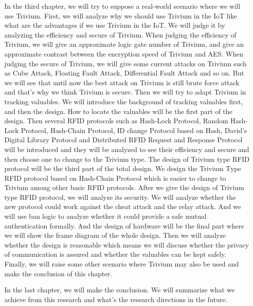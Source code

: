 \begin{bigabstract}
In the third chapter, we will try to suppose a real-world scenario where we will use Trivium. First, we will analyze why we should use Trivium in the IoT like what are the advantages if we use Trivium in the IoT. We will judge it by analyzing the efficiency and secure of Trivium. When judging the efficiency of Trivium, we will give an approximate logic gate number of Trivium, and give an approximate contrast between the encryption speed of Trivium and AES. When judging the secure of Trivium, we will give some current attacks on Trivium such as Cube Attack, Floating Fault Attack, Differential Fault Attack and so on. But we will see that until now the best attack on Trivium is still brute force attack and that’s why we think Trivium is secure. Then we will try to adapt Trivium in tracking valuables. We will introduce the background of tracking valuables first, and then the design. How to locate the valuables will be the first part of the design. Then several RFID protocols such as Hash-Lock Protocol, Random Hash-Lock Protocol, Hash-Chain Protocol, ID change Protocol based on Hash, David's Digital Library Protocol and Distributed RFID Request and Response Protocol will be introduced and they will be analyzed to see their efficiency and secure and then choose one to change to the Trivium type. The design of Trivium type RFID protocol will be the third part of the total design. We design the Trivium Type RFID protocol based on Hash-Chain Protocol which is easier to change to Trivium among other basic RFID protocols. After we give the design of Trivium type RFID protocol, we will analyze its security. We will analyze whether the new protocol could work against the cheat attack and the relay attack. And we will use ban logic to analyze whether it could provide a safe mutual authentication formally. And the design of hardware will be the final part where we will show the frame diagram of the whole design. Then we will analyze whether the design is reasonable which means we will discuss whether the privacy of communication is assured and whether the valuables can be kept safely. Finally, we will raise some other scenario where Trivium may also be used and make the conclusion of this chapter.

In the last chapter, we will make the conclusion. We will summarize what we achieve from this research and what’s the research directions in the future.
\clearpage
\end{bigabstract}